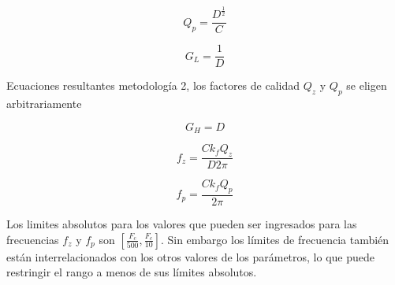 		\begin{equation}
			Q_{p} = \frac{D^{\frac{1}{2}}}{C}	
		\end{equation}
		
		\begin{equation}
			G_{L} = \frac{1}{D}
		\end{equation}
		
		Ecuaciones resultantes metodología 2, los factores de calidad $Q_{z}$ y $Q_{p}$ se eligen arbitrariamente  
		
		\begin{equation}
			G_{H} = D
		\end{equation}
		
		\begin{equation}
			f_{z} = \frac{C k_{f} Q_{z}}{D 2 \pi}	
		\end{equation}
		
		\begin{equation}
			f_{p} = \frac{C k_{f} Q_{p}}{ 2 \pi}	
		\end{equation}
		
	Los limites absolutos para los valores que pueden ser ingresados para las frecuencias $f_{z}$ y $f_{p}$ son $[\frac{F_{c}}{500}, \frac{F_{c}}{10}]$. Sin embargo los límites de frecuencia también están interrelacionados con los otros valores de los parámetros, lo que puede restringir el rango a menos de sus límites absolutos. 